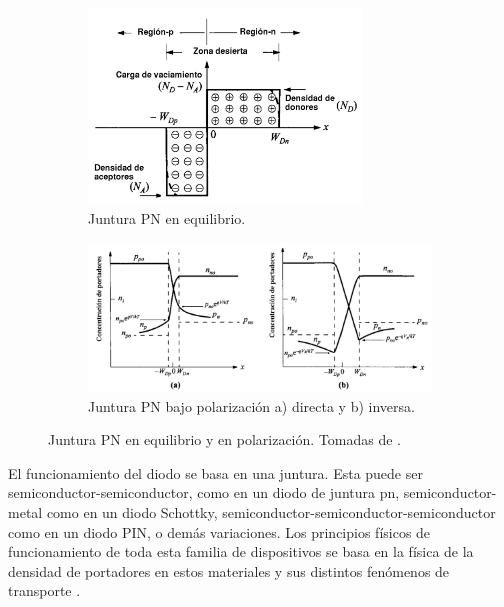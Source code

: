 \begin{figure}
    \centering
    \begin{subfigure}[b]{0.45\textwidth}
        \centering
        \includegraphics[width=0.8\textwidth]{images/pn_junction_equilibruim.png}
        \caption{Juntura PN en equilibrio.}
        \label{fig:pn_junction_equilibruim}
    \end{subfigure}
    \hfill
    \begin{subfigure}[b]{0.45\textwidth}
        \centering
        \includegraphics[width=\textwidth]{images/pn_junction_under_bias.png}
        \caption{Juntura PN bajo polarización a) directa y b) inversa.}
        \label{fig:pn_junction_under_bias}
    \end{subfigure}
    \caption{Juntura PN en equilibrio y en polarización. Tomadas de
    \cite{Sze2006}.}
    \label{fig:pn_junction_plots}
\end{figure}

El funcionamiento del diodo se basa en una juntura. Esta puede ser
semiconductor-semiconductor, como en un diodo de juntura pn, semiconductor-metal
como en un diodo Schottky, semiconductor-semiconductor-semiconductor como en un
diodo PIN, o demás variaciones. Los principios físicos de funcionamiento de toda
esta familia de dispositivos se basa en la física de la densidad de portadores
en estos materiales y sus distintos fenómenos de transporte
\cite{neamen2012semiconductor}.

